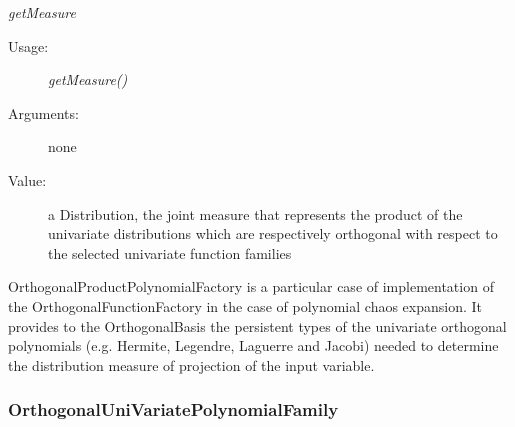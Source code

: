 \begin{description}
\begin{description}
\item \textit{getMeasure}
\begin{description}
\item[Usage:] \textit{getMeasure()}
\item[Arguments:] none
\item[Value:]  a Distribution, the joint measure that represents the product of the univariate distributions which are respectively orthogonal with respect to the selected univariate function families
\end{description}


\end{description}
\item[Details:] OrthogonalProductPolynomialFactory is a particular case of implementation of the OrthogonalFunctionFactory in the case of polynomial chaos expansion. It provides to the OrthogonalBasis the persistent types of the univariate orthogonal polynomials (e.g. Hermite, Legendre, Laguerre and Jacobi) needed to determine the distribution measure of projection of the input variable.

\end{description}







\newpage
\subsubsection{OrthogonalUniVariatePolynomialFamily}


